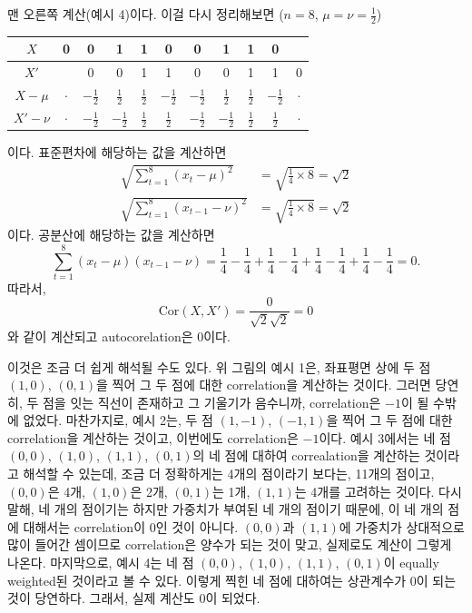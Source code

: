 \documentclass{article}
\begin{document}
맨 오른쪽 계산(예시 4)이다.
이걸 다시 정리해보면 (\(n=8\), \(\mu=\nu=\frac12\))
\begin{center}
\begin{tabular}{c|cccccccccc}
$X $&0&0&1&1&0&0&1&1&0&\\\hline
$X'$& &0&0&1&1&0&0&1&1&0\\\hline
$X-\mu$&$\cdot$&$-\frac12$&$\frac12$&$\frac12$&$-\frac12$&$-\frac12$&$\frac12$&$\frac12$&$-\frac12$&$\cdot$\\\hline
$X'-\nu$&$\cdot$&$-\frac12$&$-\frac12$&$\frac12$&$\frac12$&$-\frac12$&$-\frac12$&$\frac12$&$\frac12$&$\cdot$
\end{tabular}
\end{center}
이다.
표준편차에 해당하는 값을 계산하면
\begin{align*}
\sqrt{\sum_{t=1}^8(x_t-\mu)^2}
&=\sqrt{\frac14\times8}=\sqrt 2\\
\sqrt{\sum_{t=1}^8(x_{t-1}-\nu)^2}
&=\sqrt{\frac14\times8}=\sqrt 2
\end{align*}
이다. 공분산에 해당하는 값을 계산하면
\[\sum_{t=1}^8(x_t-\mu)(x_{t-1}-\nu)=\frac14-\frac14+\frac14-\frac14+\frac14-\frac14+\frac14-\frac14=0.\]
따라서,
\[\text{Cor}(X,X')=\frac{0}{\sqrt2\sqrt2}=0\]
와 같이 계산되고 autocorelation은 0이다.

이것은 조금 더 쉽게 해석될 수도 있다.
위 그림의 예시 1은, 좌표평면 상에 두 점 \((1,0)\), \((0,1)\)을 찍어 그 두 점에 대한 correlation을 계산하는 것이다.
그러면 당연히, 두 점을 잇는 직선이 존재하고 그 기울기가 음수니까, correlation은 \(-1\)이 될 수밖에 없었다.
마찬가지로, 예시 2는, 두 점 \((1,-1)\), \((-1,1)\)을 찍어 그 두 점에 대한 correlation을 계산하는 것이고, 이번에도 correlation은 \(-1\)이다.
예시 3에서는 네 점 \((0,0)\), \((1,0)\), \((1,1)\), \((0,1)\)의 네 점에 대하여 correalation을 계산하는 것이라고 해석할 수 있는데,
조금 더 정확하게는 4개의 점이라기 보다는, 11개의 점이고, \((0,0)\)은 4개, \((1,0)\)은 2개, \((0,1)\)는 1개, \((1,1)\)는 4개를 고려하는 것이다.
다시 말해, 네 개의 점이기는 하지만 가중치가 부여된 네 개의 점이기 때문에, 이 네 개의 점에 대해서는 correlation이 0인 것이 아니다.
\((0,0)\)과 \((1,1)\)에 가중치가 상대적으로 많이 들어간 셈이므로 correlation은 양수가 되는 것이 맞고, 실제로도 계산이 그렇게 나온다.
마지막으로, 예시 4는 네 점 \((0,0)\), \((1,0)\), \((1,1)\), \((0,1)\)이 equally weighted된 것이라고 볼 수 있다.
이렇게 찍힌 네 점에 대하여는 상관계수가 0이 되는 것이 당연하다.
그래서, 실제 계산도 0이 되었다.
\end{document}
